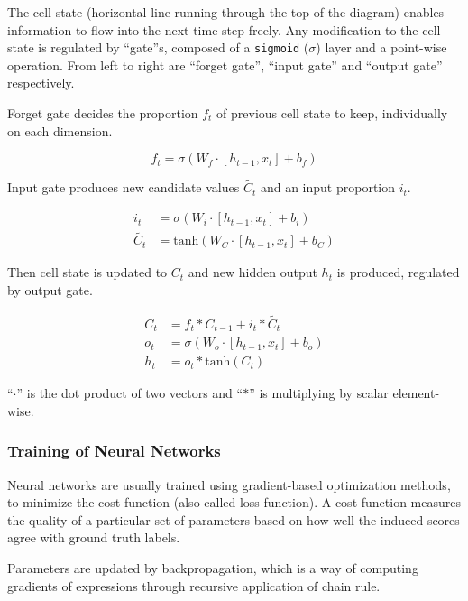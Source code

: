 \documentclass[11pt,a4paper,titlepage]{article}
\begin{document}

The cell state (horizontal line running through the top of the diagram) enables information to flow into the next time step freely.
Any modification to the cell state is regulated by \enquote{gate}s, composed of a \texttt{sigmoid} (\(\sigma\)) layer and a point-wise operation.
From left to right are \enquote{forget gate}, \enquote{input gate} and \enquote{output gate} respectively.

Forget gate decides the proportion \(f_t\) of previous cell state to keep, individually on each dimension.

\begin{equation*}
  f_t = \sigma (W_f \cdot [h_{t-1}, x_t] + b_f)
\end{equation*}

Input gate produces new candidate values \(\tilde{C_t}\) and an input proportion \(i_t\).

\begin{align*}
  i_t & = \sigma (W_i \cdot [h_{t-1}, x_t] + b_i) \\
  \tilde{C_t} & = \mathrm{tanh} (W_C \cdot [h_{t-1}, x_t] + b_C)
\end{align*}

Then cell state is updated to \(C_t\) and new hidden output \(h_t\) is produced, regulated by output gate.

\begin{align*}
  C_t & = f_t * C_{t-1} + i_t * \tilde{C_t} \\
  o_t & = \sigma (W_o \cdot [h_{t-1}, x_t] + b_o) \\
  h_t & = o_t * \mathrm{tanh}(C_t)
\end{align*}

\enquote{\(\cdot\)} is the dot product of two vectors and \enquote{\(*\)} is multiplying by scalar element-wise.

\subsubsection{Training of Neural Networks}

Neural networks are usually trained using gradient-based optimization methods, to minimize the cost function (also called loss function).
A cost function measures the quality of a particular set of parameters based on how well the induced scores agree with ground truth labels.

Parameters are updated by backpropagation, which is a way of computing gradients of expressions through recursive application of chain rule.
\end{document}
